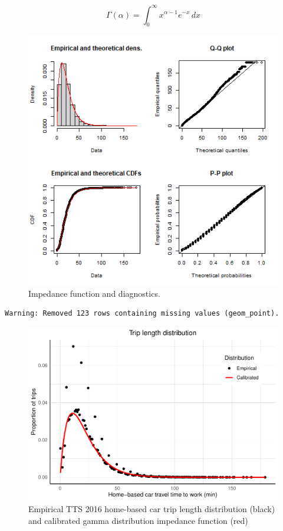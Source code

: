 \documentclass[]{elsarticle} %
\begin{document}
\[
\Gamma(\alpha) =  \int_{0}^{\infty} x^{\alpha-1}e^{-x} \,dx
\]

\begin{figure}
\includegraphics[width=1\linewidth]{images/impedance_function} \caption{\label{fig:impedance-function-plot}Impedance function and diagnostics.}\label{fig:plot-impedance-function}
\end{figure}

\begin{verbatim}
Warning: Removed 123 rows containing missing values (geom_point).
\end{verbatim}

\begin{figure}
\includegraphics[width=1\linewidth]{Spatial-Availability_files/figure-latex/TLD-Gamma-plot-1} \caption{\label{fig:TLD-Gamma-plot}Empirical TTS 2016 home-based car trip length distribution (black) and calibrated gamma distribution impedance function (red)}\label{fig:TLD-Gamma-plot}
\end{figure}
\end{document}
